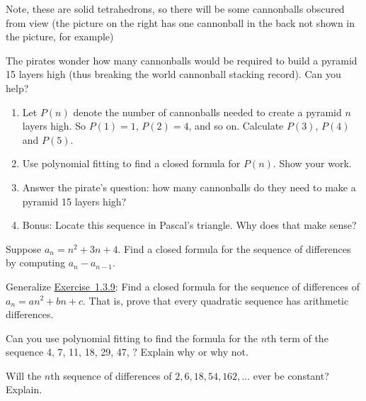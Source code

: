 \documentclass[11pt,]{book}
\theoremstyle{ptxplainnotitle}
\theoremstyle{ptxplaintitle}
\theoremstyle{ptxdefinitionnotitle}
\theoremstyle{ptxdefinitiontitle}
\theoremstyle{ptxdefinitionnotitle}
\theoremstyle{ptxdefinitiontitle}
\theoremstyle{ptxdefinitionnotitle}
\theoremstyle{ptxdefinitiontitle}
\theoremstyle{ptxdefinitiontitlenonumber}
\theoremstyle{ptxdefinitiontitlenonumber}
\numberwithin{equation}{chapter}
\begin{document}
\begin{divisionexercise}{8}
\begin{sidebyside}{3}{0.08}{0.08}{0.16}
\end{sidebyside}
\par
\hypertarget{p-396}{}%
Note, these are solid tetrahedrons, so there will be some cannonballs obscured from view (the picture on the right has one cannonball in the back not shown in the picture, for example)%
\par
\hypertarget{p-397}{}%
The pirates wonder how many cannonballs would be required to build a pyramid 15 layers high (thus breaking the world cannonball stacking record). Can you help? \leavevmode%
\begin{enumerate}[label=(\alph*)]
\item\hypertarget{li-213}{}\hypertarget{p-398}{}%
Let \(P(n)\) denote the number of cannonballs needed to create a pyramid \(n\) layers high. So \(P(1) = 1\), \(P(2) = 4\), and so on. Calculate \(P(3)\), \(P(4)\) and \(P(5)\). %
\item\hypertarget{li-214}{}\hypertarget{p-399}{}%
Use polynomial fitting to find a closed formula for \(P(n)\). Show your work. %
\item\hypertarget{li-215}{}\hypertarget{p-400}{}%
Answer the pirate's question: how many cannonballs do they need to make a pyramid 15 layers high? %
\item\hypertarget{li-216}{}\hypertarget{p-401}{}%
Bonus: Locate this sequence in Pascal's triangle. Why does that make sense?%
\end{enumerate}
%
\end{divisionexercise}%
\begin{divisionexercise}{9}\hypertarget{ex_quad-diff}{}
\hypertarget{p-404}{}%
Suppose \(a_n = n^2 + 3n + 4\text{.}\) Find a closed formula for the sequence of differences by computing \(a_n - a_{n-1}\text{.}\)%
\end{divisionexercise}%
\begin{divisionexercise}{10}\hypertarget{exercise-38}{}
\hypertarget{p-406}{}%
Generalize \hyperlink{ex_quad-diff}{Exercise~1.3.9}: Find a closed formula for the sequence of differences of \(a_n = an^2 + bn + c\). That is, prove that every quadratic sequence has arithmetic differences.%
\end{divisionexercise}%
\begin{divisionexercise}{11}\hypertarget{exercise-39}{}
\hypertarget{p-408}{}%
Can you use polynomial fitting to find the formula for the \(n\)th term of the sequence 4, 7, 11, 18, 29, 47, \textellipsis{}? Explain why or why not.%
\end{divisionexercise}%
\begin{divisionexercise}{12}\hypertarget{exercise-40}{}
\hypertarget{p-409}{}%
Will the \(n\)th sequence of differences of \(2, 6, 18, 54, 162, \ldots\) ever be constant? Explain.%
\end{divisionexercise}%
\end{document}
